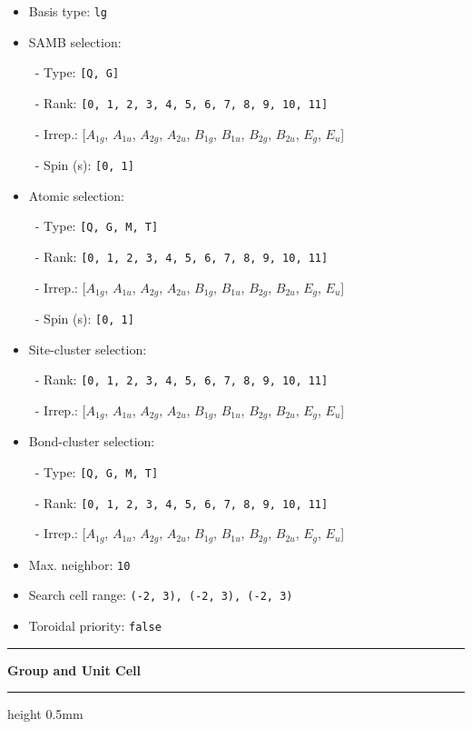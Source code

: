 \documentclass[fleqn,10pt,landscape]{jsarticle}
\begin{document}
\begin{itemize}
\item Basis type: \texttt{lg}

\item SAMB selection:

\, - Type: \texttt{[Q, G]}

\, - Rank: \texttt{[0, 1, 2, 3, 4, 5, 6, 7, 8, 9, 10, 11]}

\, - Irrep.: [$A_{1g}$, $A_{1u}$, $A_{2g}$, $A_{2u}$, $B_{1g}$, $B_{1u}$, $B_{2g}$, $B_{2u}$, $E_{g}$, $E_{u}$]

\, - Spin (s): \texttt{[0, 1]}

\item Atomic selection:

\, - Type: \texttt{[Q, G, M, T]}

\, - Rank: \texttt{[0, 1, 2, 3, 4, 5, 6, 7, 8, 9, 10, 11]}

\, - Irrep.: [$A_{1g}$, $A_{1u}$, $A_{2g}$, $A_{2u}$, $B_{1g}$, $B_{1u}$, $B_{2g}$, $B_{2u}$, $E_{g}$, $E_{u}$]

\, - Spin (s): \texttt{[0, 1]}

\item Site-cluster selection:

\, - Rank: \texttt{[0, 1, 2, 3, 4, 5, 6, 7, 8, 9, 10, 11]}

\, - Irrep.: [$A_{1g}$, $A_{1u}$, $A_{2g}$, $A_{2u}$, $B_{1g}$, $B_{1u}$, $B_{2g}$, $B_{2u}$, $E_{g}$, $E_{u}$]

\item Bond-cluster selection:

\, - Type: \texttt{[Q, G, M, T]}

\, - Rank: \texttt{[0, 1, 2, 3, 4, 5, 6, 7, 8, 9, 10, 11]}

\, - Irrep.: [$A_{1g}$, $A_{1u}$, $A_{2g}$, $A_{2u}$, $B_{1g}$, $B_{1u}$, $B_{2g}$, $B_{2u}$, $E_{g}$, $E_{u}$]

\item Max. neighbor: \texttt{10}

\item Search cell range: \texttt{(-2, 3), (-2, 3), (-2, 3)}

\item Toroidal priority: \texttt{false}

\end{itemize}
\vspace{5mm}
\noindent \rule[0.5mm]{5mm}{0.5mm}\hspace{3mm}\textbf{Group and Unit Cell}\hspace{3mm}\leaders\hrule height 0.5mm\hfill\kern0pt
\vspace{3mm}
\end{document}
